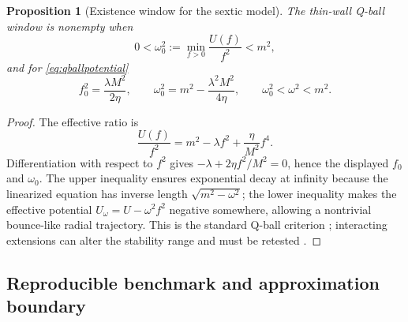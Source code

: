 \documentclass[11pt]{article}
\numberwithin{equation}{section}
\newtheorem{proposition}[theorem]{Proposition}
\begin{document}
\begin{proposition}[Existence window for the sextic model]
The thin-wall Q-ball window is nonempty when
\begin{equation}
 0<\omega_0^2:=\min_{f>0}\frac{U(f)}{f^2}<m^2,
 \end{equation}
and for \eqref{eq:qballpotential}
\begin{equation}
 f_0^2=\frac{\lambda M^2}{2\eta},\qquad
 \omega_0^2=m^2-\frac{\lambda^2M^2}{4\eta},
 \qquad \omega_0^2<\omega^2<m^2.
 \label{eq:qwindow}
\end{equation}
\end{proposition}

\begin{proof}
The effective ratio is
\begin{equation}
 \frac{U(f)}{f^2}=m^2-\lambda f^2+\frac\eta{M^2}f^4.
\end{equation}
Differentiation with respect to \(f^2\) gives
\(-\lambda+2\eta f^2/M^2=0\), hence the displayed \(f_0\) and \(\omega_0\).
The upper inequality ensures exponential decay at infinity because the
linearized equation has inverse length \(\sqrt{m^2-\omega^2}\); the lower
inequality makes the effective potential \(U_\omega=U-\omega^2f^2\) negative
somewhere, allowing a nontrivial bounce-like radial trajectory.  This is the
standard Q-ball criterion \cite{Coleman1985}; interacting extensions can
alter the stability range and must be retested \cite{Hamada2024}.
\end{proof}

\subsection{Reproducible benchmark and approximation boundary}
\end{document}
